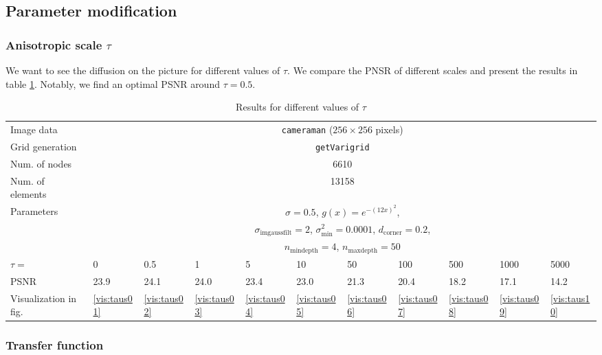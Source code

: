\documentclass{report}
\begin{document}
\subsection{Parameter modification}

\subsubsection{Anisotropic scale $\tau$}

We want to see the diffusion on the picture for different values of $\tau$. We compare the PNSR of different scales and present the results in table \ref{res:taus}. Notably, we find an optimal PSNR around $\tau = 0.5$.

\begin{table}[h]
	\centering
	\begin{tabular}{|lllllllllll}
		Image data & \multicolumn{10}{c}{\texttt{cameraman} ($256 \times 256$ pixels)} \\
		Grid generation & \multicolumn{10}{c}{\texttt{getVarigrid}} \\
		Num. of nodes & \multicolumn{10}{c}{6610} \\
		Num. of elements & \multicolumn{10}{c}{13158} \\
		Parameters & \multicolumn{10}{c}{$\sigma=0.5$, $g(x) = e^{-(12 x)^2}$,} \\
		& \multicolumn{10}{c}{$\sigma_\text{imgaussfilt}=2$, $\sigma^2_\text{min}=0.0001$, $d_\text{corner}=0.2$,} \\
		& \multicolumn{10}{c}{$n_\text{mindepth}=4$, $n_\text{maxdepth}=50$} \\
		$\tau =$ & 0 & 0.5 & 1 & 5 & 10 & 50 & 100 & 500 & 1000 & 5000\\
		PSNR & 23.9 & 24.1 & 24.0 & 23.4 & 23.0 & 21.3 & 20.4 & 18.2 & 17.1 & 14.2 \\
		Visualization in fig. &  \ref{vis:taus01} &  \ref{vis:taus02} &  \ref{vis:taus03} &  \ref{vis:taus04} &  \ref{vis:taus05} &  \ref{vis:taus06} &  \ref{vis:taus07} &  \ref{vis:taus08} &  \ref{vis:taus09} &  \ref{vis:taus10} \\
	\end{tabular}
	\caption{Results for different values of $\tau$}
	\label{res:taus}
\end{table}

\subsubsection{Transfer function}
\end{document}
